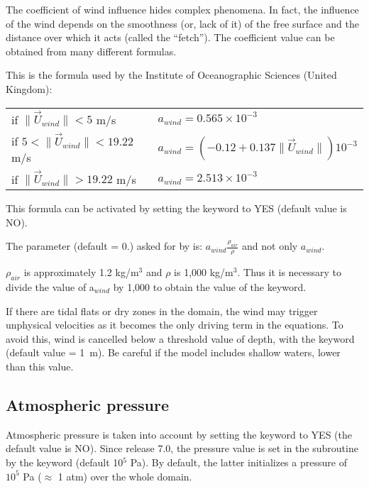 The coefficient of wind influence hides complex phenomena.
In fact, the influence of the wind depends on the smoothness (or, lack of it)
of the free surface and the distance over which it acts (called the ``fetch'').
The coefficient value can be obtained from many different formulas.

This is the formula used by the Institute of Oceanographic Sciences
(United Kingdom):


\begin{tabular}{ll}

if $\| \vec{U}_{wind} \| < 5$ m/s & $a_{wind}  = 0.565 \times 10^{-3}$ \\
if $5 < \| \vec{U}_{wind} \| < 19.22$ m/s &
 $a_{wind} = (- 0.12 + 0.137 \| \vec{U}_{wind} \| ) 10^{-3}$ \\
if $\| \vec{U}_{wind} \| > 19.22$ m/s & $a_{wind} = 2.513 \times 10^{-3}$ \\
\end{tabular}


This formula can be activated by setting the keyword
 to YES
(default value is NO).

The parameter  (default = 0.)
asked for by  is:
$a_{wind} \frac{\rho_{air}}{\rho}$ and not only $a_{wind}$.

$\rho_{air}$ is approximately 1.2 kg/m$^3$ and $\rho$ is 1,000 kg/m$^3$.
Thus it is necessary to divide the value of a$_{wind}$ by 1,000
to obtain the value of the  keyword.

If there are tidal flats or dry zones in the domain, the wind may trigger
unphysical velocities as it becomes the only driving term in the equations.
To avoid this, wind is cancelled below a threshold value of depth,
with the keyword  (default value = 1~m).
Be careful if the model includes shallow waters, lower than this value.

\subsection{Atmospheric pressure}

Atmospheric pressure is taken into account by setting the keyword
 to YES (the default value is NO).
Since release 7.0, the pressure value is set in the 
subroutine by the keyword 
(default 10$^5$ Pa).
By default, the latter initializes a pressure of $10^5$ Pa ($\approx$ 1 atm)
over the whole domain.

